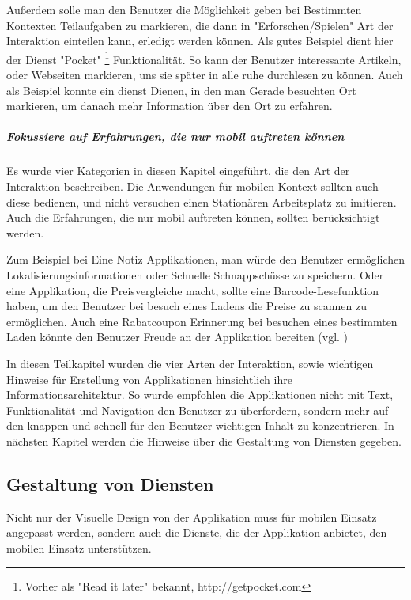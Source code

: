 Außerdem solle man den Benutzer die Möglichkeit geben bei Bestimmten Kontexten Teilaufgaben zu markieren, die dann in "Erforschen/Spielen" Art der Interaktion einteilen kann, erledigt werden können. Als gutes Beispiel dient hier der Dienst "Pocket" \footnote{Vorher als "Read it later" bekannt, http://getpocket.com } Funktionalität. So kann der Benutzer interessante Artikeln, oder Webseiten markieren, uns sie später in alle ruhe durchlesen zu können. Auch als Beispiel konnte ein dienst Dienen, in den man Gerade besuchten Ort markieren, um danach mehr Information über den Ort zu erfahren.

\subparagraph{Fokussiere auf Erfahrungen, die nur mobil auftreten können} %
\label{subp:fokussiere_auf_erfahrungen_die_nur_mobil_auftreten_k_nnen}

Es wurde vier Kategorien in diesen Kapitel eingeführt, die den Art der Interaktion beschreiben. Die Anwendungen für mobilen Kontext sollten auch diese bedienen, und nicht versuchen einen Stationären Arbeitsplatz zu imitieren. Auch die Erfahrungen, die nur mobil auftreten können, sollten berücksichtigt werden.

Zum Beispiel bei Eine Notiz Applikationen, man würde den Benutzer ermöglichen Lokalisierungsinformationen oder Schnelle Schnappschüsse zu speichern. Oder eine Applikation, die Preisvergleiche macht, sollte eine Barcode-Lesefunktion haben, um den Benutzer bei besuch eines Ladens die Preise zu scannen zu ermöglichen. Auch eine Rabatcoupon Erinnerung bei besuchen eines bestimmten Laden könnte den Benutzer Freude an der Applikation bereiten (vgl. \cite{smartOnline})
\newline

In diesen Teilkapitel wurden die vier Arten der Interaktion, sowie wichtigen Hinweise für Erstellung von Applikationen hinsichtlich ihre Informationsarchitektur. So wurde empfohlen die Applikationen nicht mit Text, Funktionalität und Navigation den Benutzer zu überfordern, sondern mehr auf den knappen und schnell für den Benutzer wichtigen Inhalt zu konzentrieren. In nächsten Kapitel werden die Hinweise über die Gestaltung von Diensten gegeben.

\subsection{Gestaltung von Diensten}
\label{sub:gestaltung_von_diensten}

Nicht nur der Visuelle Design von der Applikation muss für mobilen Einsatz angepasst werden, sondern auch die Dienste, die der Applikation anbietet, den mobilen Einsatz unterstützen. 

